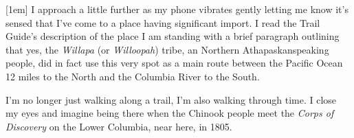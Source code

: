 [1em]
I approach a little further as my phone vibrates gently letting me know it's 
sensed that I've come to a place having significant import. I read the
Trail Guide's description of the place I am standing with a brief paragraph outlining
that yes, the \emph{Willapa} (or \emph{Willoopah}) tribe, an Northern
Athapaskan\textendash speaking people, did in fact use this very spot as a main
route between the Pacific Ocean 12 miles to the North and the Columbia River to
the South.

I'm no longer just walking along a trail, I'm also walking through time. I close my eyes
and imagine being there when the Chinook people meet the \emph{Corps of Discovery} on the Lower Columbia, near here, in 1805.

